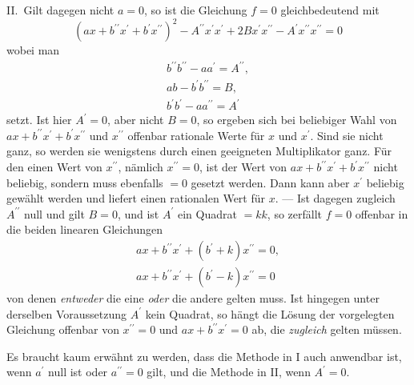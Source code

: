 II.\ Gilt dagegen nicht \(a=0\), so ist die Gleichung \(f=0\) gleichbedeutend mit
\[(ax+b^{\prime\prime}x^\prime+b^\prime x^{\prime\prime})^2-A^{\prime\prime}x^\prime x^\prime+2B x^\prime x^{\prime\prime}-A^\prime x^{\prime\prime}x^{\prime\prime}=0\]
wobei man
\[\begin{gathered}b^{\prime\prime}b^{\prime\prime}-aa^\prime=A^{\prime\prime},\\ ab-b^\prime b^{\prime\prime}=B,\\ b^\prime b^\prime-aa^{\prime\prime}=A^\prime\end{gathered}\]
setzt. Ist hier \(A^\prime=0\), aber nicht \(B=0\), so ergeben sich bei beliebiger Wahl von \(ax+b^{\prime\prime}x^\prime+b^\prime x^{\prime\prime}\) und \(x^{\prime\prime}\) offenbar rationale Werte für \(x\) und \(x^\prime\). Sind sie nicht ganz, so werden sie wenigstens durch einen geeigneten Multiplikator ganz. Für den einen Wert von \(x^{\prime\prime}\), nämlich \(x^{\prime\prime}=0\), ist der Wert von \(ax+b^{\prime\prime}x^\prime+b^\prime x^{\prime\prime}\) nicht beliebig, sondern muss ebenfalls \(=0\) gesetzt werden. Dann kann aber \(x^\prime\) beliebig gewählt werden und liefert einen rationalen Wert für \(x\). — Ist dagegen zugleich \(A^{\prime\prime}\) null und gilt \(B=0\), und ist \(A^\prime\) ein Quadrat \(=kk\), so zerfällt \(f=0\) offenbar in die beiden linearen Gleichungen
\[\begin{gathered}ax+b^{\prime\prime}x^\prime+(b^\prime+k)x^{\prime\prime}=0,\\ ax+b^{\prime\prime}x^\prime+(b^\prime-k)x^{\prime\prime}=0\end{gathered}\]
von denen \textit{entweder} die eine \textit{oder} die andere gelten muss. Ist hingegen unter derselben Voraussetzung \(A^\prime\) kein Quadrat, so hängt die Lösung der vorgelegten Gleichung offenbar von \(x^{\prime\prime}=0\) und \(ax+b^{\prime\prime}x^\prime=0\) ab, die \textit{zugleich} gelten müssen.

Es braucht kaum erwähnt zu werden, dass die Methode in I auch anwendbar ist, wenn \(a^\prime\) null ist oder \(a^{\prime\prime}=0\) gilt, und die Methode in II, wenn \(A^\prime=0\).

